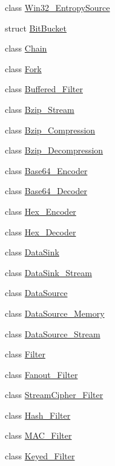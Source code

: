 \begin{DoxyCompactItemize}
class \hyperlink{classBotan_1_1Win32__EntropySource}{Win32\-\_\-\-Entropy\-Source}
\item 
struct \hyperlink{structBotan_1_1BitBucket}{Bit\-Bucket}
\item 
class \hyperlink{classBotan_1_1Chain}{Chain}
\item 
class \hyperlink{classBotan_1_1Fork}{Fork}
\item 
class \hyperlink{classBotan_1_1Buffered__Filter}{Buffered\-\_\-\-Filter}
\item 
class \hyperlink{classBotan_1_1Bzip__Stream}{Bzip\-\_\-\-Stream}
\item 
class \hyperlink{classBotan_1_1Bzip__Compression}{Bzip\-\_\-\-Compression}
\item 
class \hyperlink{classBotan_1_1Bzip__Decompression}{Bzip\-\_\-\-Decompression}
\item 
class \hyperlink{classBotan_1_1Base64__Encoder}{Base64\-\_\-\-Encoder}
\item 
class \hyperlink{classBotan_1_1Base64__Decoder}{Base64\-\_\-\-Decoder}
\item 
class \hyperlink{classBotan_1_1Hex__Encoder}{Hex\-\_\-\-Encoder}
\item 
class \hyperlink{classBotan_1_1Hex__Decoder}{Hex\-\_\-\-Decoder}
\item 
class \hyperlink{classBotan_1_1DataSink}{Data\-Sink}
\item 
class \hyperlink{classBotan_1_1DataSink__Stream}{Data\-Sink\-\_\-\-Stream}
\item 
class \hyperlink{classBotan_1_1DataSource}{Data\-Source}
\item 
class \hyperlink{classBotan_1_1DataSource__Memory}{Data\-Source\-\_\-\-Memory}
\item 
class \hyperlink{classBotan_1_1DataSource__Stream}{Data\-Source\-\_\-\-Stream}
\item 
class \hyperlink{classBotan_1_1Filter}{Filter}
\item 
class \hyperlink{classBotan_1_1Fanout__Filter}{Fanout\-\_\-\-Filter}
\item 
class \hyperlink{classBotan_1_1StreamCipher__Filter}{Stream\-Cipher\-\_\-\-Filter}
\item 
class \hyperlink{classBotan_1_1Hash__Filter}{Hash\-\_\-\-Filter}
\item 
class \hyperlink{classBotan_1_1MAC__Filter}{M\-A\-C\-\_\-\-Filter}
\item 
class \hyperlink{classBotan_1_1Keyed__Filter}{Keyed\-\_\-\-Filter}
\item 

\end{DoxyCompactItemize}
